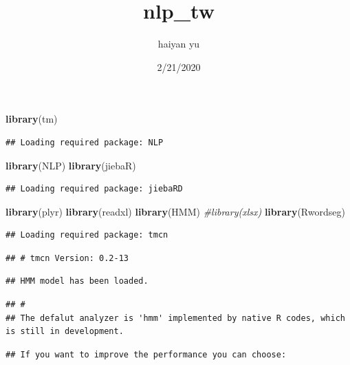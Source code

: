 \documentclass[]{article}
\title{nlp\_tw}
\author{haiyan yu}
\date{2/21/2020}
\newenvironment{Shaded}{\begin{snugshade}}{\end{snugshade}}
\newcommand{\KeywordTok}[1]{\textcolor[rgb]{0.13,0.29,0.53}{\textbf{#1}}}
\newcommand{\CommentTok}[1]{\textcolor[rgb]{0.56,0.35,0.01}{\textit{#1}}}
\newcommand{\NormalTok}[1]{#1}
\begin{document}
\maketitle

\begin{Shaded}
\begin{Highlighting}[]
\KeywordTok{library}\NormalTok{(tm)}
\end{Highlighting}
\end{Shaded}

\begin{verbatim}
## Loading required package: NLP
\end{verbatim}

\begin{Shaded}
\begin{Highlighting}[]
\KeywordTok{library}\NormalTok{(NLP)}
\KeywordTok{library}\NormalTok{(jiebaR)}
\end{Highlighting}
\end{Shaded}

\begin{verbatim}
## Loading required package: jiebaRD
\end{verbatim}

\begin{Shaded}
\begin{Highlighting}[]
\KeywordTok{library}\NormalTok{(plyr)}
\KeywordTok{library}\NormalTok{(readxl)}
\KeywordTok{library}\NormalTok{(HMM)}
\CommentTok{#library(xlsx)}
\KeywordTok{library}\NormalTok{(Rwordseg)}
\end{Highlighting}
\end{Shaded}

\begin{verbatim}
## Loading required package: tmcn
\end{verbatim}

\begin{verbatim}
## # tmcn Version: 0.2-13
\end{verbatim}

\begin{verbatim}
## HMM model has been loaded.
\end{verbatim}

\begin{verbatim}
## # 
## The defalut analyzer is 'hmm' implemented by native R codes, which is still in development.
\end{verbatim}

\begin{verbatim}
## If you want to improve the performance you can choose:
\end{verbatim}
\end{document}
